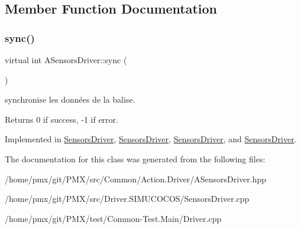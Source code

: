 \subsection{Member Function Documentation}
\mbox{\label{classASensorsDriver_a0c581029ba10d5ac820a9e3e2e6883cd}} 
\subsubsection{\texorpdfstring{sync()}{sync()}}
{\footnotesize\ttfamily virtual int A\+Sensors\+Driver\+::sync (\begin{DoxyParamCaption}{ }\end{DoxyParamCaption})\hspace{0.3cm}{\ttfamily [pure virtual]}}



synchronise les données de la balise. 

\begin{DoxyReturn}{Returns}
0 if success, -\/1 if error. 
\end{DoxyReturn}


Implemented in \hyperlink{classSensorsDriver_a1bfbcc82461257094ed185fa2017afad}{Sensors\+Driver}, \hyperlink{classSensorsDriver_a1bfbcc82461257094ed185fa2017afad}{Sensors\+Driver}, \hyperlink{classSensorsDriver_a1bfbcc82461257094ed185fa2017afad}{Sensors\+Driver}, and \hyperlink{classSensorsDriver_a1bfbcc82461257094ed185fa2017afad}{Sensors\+Driver}.



The documentation for this class was generated from the following files\+:\begin{DoxyCompactItemize}
\item 
/home/pmx/git/\+P\+M\+X/src/\+Common/\+Action.\+Driver/A\+Sensors\+Driver.\+hpp\item 
/home/pmx/git/\+P\+M\+X/src/\+Driver.\+S\+I\+M\+U\+C\+O\+C\+O\+S/Sensors\+Driver.\+cpp\item 
/home/pmx/git/\+P\+M\+X/test/\+Common-\/\+Test.\+Main/Driver.\+cpp\end{DoxyCompactItemize}

